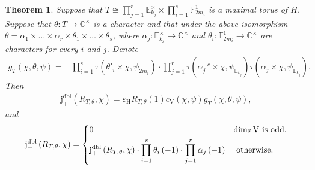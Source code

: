 \documentclass[12pt, reqno]{amsart}
\newtheorem{theorem}{Theorem}[section]
\theoremstyle{definition}
\theoremstyle{definition}
\theoremstyle{definition}
\newcommand{\cComplex}{\mathbb{C}}
\newcommand{\multiplicativegroup}[1]{#1^{\times}}
\newcommand{\hermitianSpace}{\mathrm{V}}
\newcommand{\fieldCharacter}{\psi}
\newcommand{\minusInvolution}[1]{#1^{-c}}
\newcommand{\finiteField}{\mathbb{F}}
\newcommand{\quadraticExtension}{\mathbb{E}}
\newcommand{\finiteFieldExtension}[1]{\finiteField_{#1}}
\newcommand{\quadraticFieldExtension}[1]{\quadraticExtension_{#1}}
\newcommand{\dblPosVirtualJacobiSumScalar}[2]{\mathrm{j}_{+}^{\mathrm{dbl}}\left(#1, #2\right)}
\newcommand{\dblNegVirtualJacobiSumScalar}[2]{\mathrm{j}_{-}^{\mathrm{dbl}}\left(#1, #2\right)}
\newcommand{\GaussSumCharacter}[3]{\tau\left(#1 \times #2, #3\right)}
\newcommand{\algebraicGroup}[1]{\boldsymbol{\mathrm{#1}}}
\begin{document}
\begin{theorem}\label{thm:computation-of-doubling-gauss-sum-scalar-for-deligne-lusztig-characters}
	Suppose that $T \cong \prod_{j=1}^r \multiplicativegroup{\quadraticFieldExtension{k_j}} \times \prod_{i=1}^s \finiteFieldExtension{2m_i}^1$ is a maximal torus of $H$. Suppose that $\theta \colon T \to \multiplicativegroup{\cComplex}$ is a character and that under the above isomorphism $\theta = \alpha_1 \times \dots \times \alpha_r \times \theta_1 \times \dots \times \theta_s$, where $\alpha_j \colon \multiplicativegroup{\quadraticFieldExtension{k_j}} \to \multiplicativegroup{\cComplex}$ and $\theta_i \colon \finiteFieldExtension{2m_i}^1 \to \multiplicativegroup{\cComplex}$ are characters for every $i$ and $j$. Denote \begin{align*}
		g_T\left(\chi, \theta, \fieldCharacter\right)
		= & \prod_{i=1}^s \GaussSumCharacter{\theta'_i}{\chi}{\fieldCharacter_{2m_i}} \cdot \prod_{j=1}^r \GaussSumCharacter{\minusInvolution{\alpha_j}}{\chi}{\fieldCharacter_{\quadraticFieldExtension{k_j}}} \GaussSumCharacter{\alpha_j}{\chi}{\fieldCharacter_{\quadraticFieldExtension{k_j}}}.
	\end{align*} Then
	\begin{align*}
		 \dblPosVirtualJacobiSumScalar{R_{T, \theta}}{\chi} = \varepsilon_{\algebraicGroup{H}} R_{T,\theta}\left(1\right) c_{\hermitianSpace}\left(\chi, \fieldCharacter\right) g_T\left(\chi, \theta, \fieldCharacter\right),
	\end{align*}
	and \begin{align*}
		\dblNegVirtualJacobiSumScalar{R_{T, \theta}}{\chi} = \begin{dcases}
			0 & \dim_{\finiteField} \hermitianSpace \text{ is odd.}\\
			\dblPosVirtualJacobiSumScalar{R_{T, \theta}}{\chi} \cdot \prod_{i=1}^s \theta_i\left(-1\right) \cdot \prod_{j=1}^r \alpha_j\left(-1\right) & \text{ otherwise.}
		\end{dcases}
	\end{align*}
\end{theorem}
\end{document}
